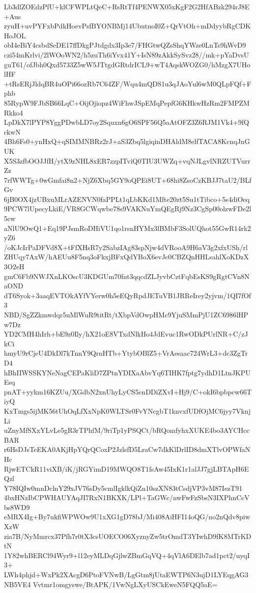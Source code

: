 Lb3dlZOEdzPfU+klCFWPLtQeC+RsRtTf4PENWX05xKgF2G2HfABzk294rJ8E+Aus
zyuH+uvPYFxbPdkHoevPsfBYONBMj14UbutnoI0Z+QrVtOh+mDdyybRgCDKHoJOL
obI4eBiY4csbdSeDE17ffDkgPJtdgdx3Ip3e7/FHGtwQZsShqYWze0LnTs9hWvD9
czi54mKrlvi/2lWOoWN2/h5zuTh6iYvx41Y+IsN89zAkkSySvz28//mk+pYaDvsU
guT61/ofJbh0Qxd5733Z5wW5JTtgdGRtdrICL9+wT4AqskWOZG0/hMzgX7UHolHF
+tRsERjJldqBR4uOPi66ozRb7C64ZF/Wqu4mQDS1u3qJAoYul6wM0QLpFQf+Fphb
85RypW9FJbSB66LqC+OijOjiopz4WiFhwJSpEMqPepfG6KHkwHzRm2FMPZMRkko4
LpDkX7lPYP8YggPDwbLD7oy2Squxn6gO6SPF56Q5aAtOFZ3Z6RJM1Vk4+9fQckwN
4Bh6Fs0+ynHxQ+qSIMMNBRz2rJ+aS3Zbq5lgiqinDHAldM8elfTACA8KcnqJnGUK
X5S3zfbOOJJfH/ytX9zNHL8xER7zzpITviQ0TIU3UWZq+vqNJLgvlNRZUTVurrZz
7rfWWTg+0wGmfai8n2+NjZ6Xbq5GY9oQPEi8UT+68hi8ZsoCzKBJJ7taU2/BLfGv
6jB0OX4jzUBxuMLrAZENVN0faPPLt1qLbKKd1Mfte20zt5Su1tTibco+5s4diOeq
9PCW7lUpecyLkiE/VR8GCWqwbe78s9VAKNuYmQEgRj9Nz3CgSp00olzwFDe2l5cw
aNlU9OwQ1+Eq19PJsmRoDHiVU1qo1rsnHYMx3lBMbF3SolUQhot55GwR14rk2yZ6
/oKJcIrPaDFVd8X+tFfXHsR7y2SabzIAg83spNjw4dVRooA9H6aV3g2xfxUSh/rl
ZHUqy7AxW/hAEUu8F5nq3oFkxjBFxQdYBoX6evJc0CBZQnHHLsahlXoKDzX3O2eH
gmC6Fb9NWJXnLKOscU3KDGUm70fnt3qqcdZLJyvbCztFqbEsKS9gRgtCVn8NaOND
dT6Syok+3aaqEVTOkAYfVYerw0h5eEQyRpdJETuVB1JRReIrey2yjvm/1QI7fOf3
NBD/SgZZkmwdqr5uMlWuR9titRt/tXbpVdOwpHMc9YjuSMmPjU1ZC6986lHPw7Dz
YD2CMH4hIrh+bE9z0Ily/hX21oE8VTxdNlkHo4JdEvuc1RwODkPUrlNR+C/zJkCi
hmyU9rCjeU4DkDl7kTnnY9QrnHTb+YtybOBlZ5+VrAesaac724WrL3+dc3ZgTrD4
hBhIIWSSKYNeNagCEPaKliD7ZPtnYDIXaAbvYq6TIHK7fptg7ydhD1LtnJKPUEsq
pnAT+yykm16KZUu/XGdbN2xnUhyLyCS5cnDDiZXvI+Hj9/C+okI6bpbpcw66TiyQ
KxTmgs5ijMK56tUhOqLfXxNpK0WLTSr0FvYNcgbT1knvxfUDfOjMC6jyy7VknjLi
uZnyMfSXxYLvLe5gR3rTPhfM/9riTp1yPSQCt/bRQomfyhxXUKE4bo3AYCHccBAR
r6HsDJsTeEKA0AKjHpYQrQCoxP2JzlsfD5LraCw7dkKlDrlID8dmXTlvOPWfaNHc
RjwETCkR11viXB/iK/jRGYimD19MWQO8T1fsAw45IxK1r1alJJ7gjLBTApH6EQzl
Y78IQIw0mnDclnY29xJV76sDy5cmlIgklkQiZn10szXN83tCsdjVP3vM87IezT91
4bxHNzIbCPWHAUYAqJI7RxN1BKXK/LPl+TaGWc/nwFwFzSbsN3IXPhnCcVbs8WD9
eMRX4Ig+By7ukfiWPWOw9U1xXG1gD78bJ/Mi408AiHFI14oQG/no2nQdv8piwXzW
zia7B/NyMmrcx37Pfh7r0tX3csUOECO06XyznyZw5trOmdT3YIwhD9fK8MTrKDtN
1Y82whBERCl94Wyr9+l12eyMLDqGjlwZBmGqVQ+4qVlA6DElb7ad1pct2/uyqI3+
LWh4phjd+WxPk2XAcgD6PtoFVNwB/LgGtm8jUtaEWTP6N3ujD1LYEqgAG3NB5VE4
Vvtmr1omgyswe/BtAPK/1VwNgLXyUSCkEweN5FQQ5aE=
